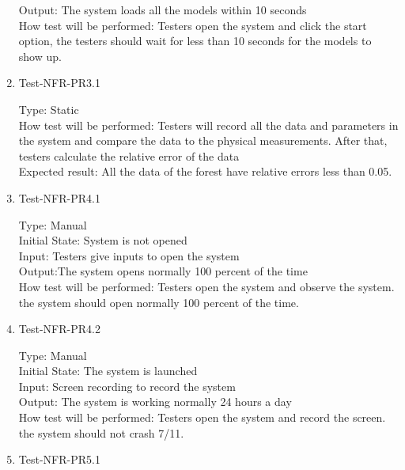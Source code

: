 \documentclass[12pt, titlepage]{article}
\begin{document}
\begin{enumerate}
Output: The system loads all the models within 10 seconds\\

How test will be performed: Testers open the system and click the start option, the testers should wait for less than 10 seconds for the models to show up.

\item{Test-NFR-PR3.1\\}

Type: Static\\

How test will be performed: Testers will record all the data and parameters in the system and compare the data to the physical measurements. After that, testers calculate the relative error of the data\\

Expected result: All the data of the forest have relative errors less than 0.05.

\item{Test-NFR-PR4.1\\}

Type: Manual\\

Initial State: System is not opened\\

Input: Testers give inputs to open the system\\

Output:The system opens normally 100 percent of the time\\

How test will be performed: Testers open the system and observe the system. the system should open normally 100 percent of the time.

\item{Test-NFR-PR4.2\\}

Type: Manual\\

Initial State: The system is launched\\

Input: Screen recording to record the system\\

Output: The system is working normally 24 hours a day\\

How test will be performed: Testers open the system and record the screen. the system should not crash 7/11.

\item{Test-NFR-PR5.1\\}


\end{enumerate}
\end{document}
